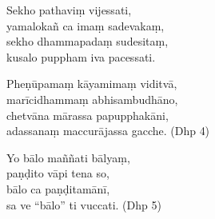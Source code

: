 Sekho pathaviṃ vijessati,\\
yamalokañ ca imaṃ sadevakaṃ,\\
sekho dhammapadaṃ sudesitaṃ,\\
kusalo puppham iva pacessati.

Pheṇūpamaṃ kāyamimaṃ viditvā,\\
marīcidhammaṃ abhisambudhāno,\\
chetvāna mārassa papupphakāni,\\
adassanaṃ maccurājassa gacche. \hfill(Dhp 4)

Yo bālo maññati bālyaṃ,\\
paṇḍito vāpi tena so,\\
bālo ca paṇḍitamānī,\\
sa ve “bālo” ti vuccati. \hfill(Dhp 5)